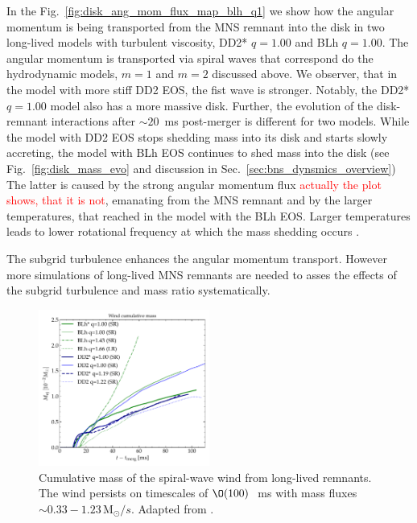 \documentclass[11pt,a4paper,headinclude=true,DIV=14,BCOR=8mm,chapterprefix,listof=totoc,twoside,openright,abstracton]{scrbook}
\def\Msun{{\text{M}_{\odot}}}
\newcommand{\red}[1]{\textcolor{red}{#1}}
\newcommand{\swind}{spiral-wave wind}
\newcommand{\pmerg}{post-merger}
\newcommand{\mr}{mass ratio}
\begin{document}
In the Fig.~\ref{fig:disk_ang_mom_flux_map_blh_q1} we show how the 
angular momentum is being transported from the \ac{MNS} remnant into the disk
in two long-lived models with turbulent viscosity, DD2* $q=1.00$ and BLh $q=1.00$.
The angular momentum is transported via spiral waves that correspond do the 
hydrodynamic models, $m=1$ and $m=2$ discussed above.
We observer, that in the model with more stiff DD2 \ac{EOS},
the fist wave is stronger. Notably, the DD2* $q=1.00$ model 
also has a more massive disk.
Further, the evolution of the disk-remnant interactions 
after $\sim20$~ms \pmerg{} is different for two models. 
While the model with DD2 \ac{EOS} stops shedding mass into 
its disk and starts slowly accreting, the model with BLh \ac{EOS} continues to shed mass into the disk
(see Fig.~\ref{fig:disk_mass_evo} and discussion in
Sec.~\ref{sec:bns_dynsmics_overview})
The latter is caused by the strong angular momentum flux \red{actually the plot shows, that it is not}, emanating 
from the \ac{MNS} remnant and by the larger temperatures, 
that reached in the model with the BLh \ac{EOS}.
Larger temperatures leads to lower rotational frequency 
at which the mass shedding occurs \citep{Kaplan:2013wra}. 

The subgrid turbulence enhances the angular momentum transport. However more simulations of long-lived 
\ac{MNS} remnants are needed to asses the effects of the 
subgrid turbulence and \mr{} systematically. 

\begin{figure}[t]
    \centering 
    \includegraphics[width=0.50\textwidth]{./figs/ejecta_postdyn/wind_mass_flux.pdf}
    \caption{Cumulative mass of the \swind{} from long-lived
        remnants. The wind persists on timescales of $\O(100)\,$~ms with
        mass fluxes ${\sim}0.33-1.23\,\Msun/s$.
        Adapted from \citet{Nedora:2020pak}.
    }
    \label{fig:mej:bern}
\end{figure}
\end{document}
